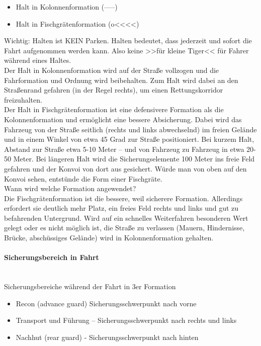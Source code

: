 	\begin{itemize}
		\item Halt in Kolonnenformation (-----)
		\item Halt in Fischgrätenformation (o<<<<)
	\end{itemize}

	Wichtig: Halten ist KEIN Parken. Halten bedeutet, dass jederzeit und sofort die Fahrt aufgenommen werden kann. Also keine >>für kleine Tiger<< für Fahrer während eines Haltes. \\
	Der Halt in Kolonnenformation wird auf der Straße vollzogen und die Fahrformation und Ordnung wird beibehalten. Zum Halt wird dabei an den Straßenrand gefahren (in der Regel rechts), um einen Rettungskorridor freizuhalten. \\
	Der Halt in Fischgrätenformation ist eine defensivere Formation als die Kolonnenformation und ermöglicht eine bessere Absicherung. Dabei wird das Fahrzeug von der Straße seitlich (rechts und links abwechselnd) im freien Gelände und in einem Winkel von etwa 45 Grad  zur Straße positioniert. Bei kurzem Halt, Abstand zur Straße etwa 5-10 Meter – und von Fahrzeug zu Fahrzeug in etwa 20-50 Meter. Bei längeren Halt wird die Sicherungselemente 100 Meter ins freie Feld gefahren und der Konvoi von dort aus gesichert. Würde man von oben auf den Konvoi sehen, entstünde die Form einer Fischgräte. \\
	Wann wird welche Formation angewendet? \\
	Die Fischgrätenformation ist die bessere, weil sicherere Formation. Allerdings erfordert sie deutlich mehr Platz, ein freies Feld rechts und links und gut zu befahrenden Untergrund. Wird auf ein schnelles Weiterfahren besonderen Wert gelegt oder es nicht möglich ist, die Straße zu verlassen (Mauern, Hindernisse, Brücke, abschüssiges Gelände) wird in Kolonnenformation gehalten. \\
\paragraph{Sicherungsbereich in Fahrt} \ \\
Sicherungsbereiche während der Fahrt in 3er Formation

	\begin{itemize}
		\item Recon (advance guard) Sicherungsschwerpunkt nach vorne
		\item Transport und Führung – Sicherungsschwerpunkt nach rechts und links
		\item Nachhut (rear guard) - Sicherungsschwerpunkt nach hinten
	\end{itemize}

